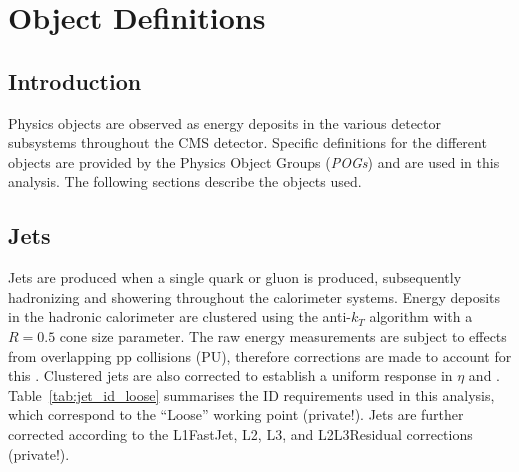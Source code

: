 \chapter{Object Definitions}

\ifpdf
    \graphicspath{{Chapter4/Figs/Raster/}{Chapter4/Figs/PDF/}{Chapter4/Figs/}}
\else
    \graphicspath{{Chapter4/Figs/Vector/}{Chapter4/Figs/}}
\fi


\section{Introduction}  %
\label{sec:objects_introduction}

Physics objects are observed as energy deposits in the various detector 
subsystems throughout the CMS detector. Specific definitions for the different 
objects are provided by the Physics Object Groups (\emph{POGs}) and are used in this 
analysis. The following sections describe the objects used.


\section{Jets}  %
\label{sec:objects_jets}

Jets are produced when a single quark or gluon is produced, subsequently 
hadronizing and showering throughout the calorimeter systems. Energy deposits in
the hadronic calorimeter are clustered using the anti-$k_T$ algorithm \cite{antikt} with
a $R=0.5$ cone size parameter. The raw energy measurements are subject to 
effects from overlapping pp collisions (PU), therefore corrections are made to
account for this \cite{Cacciari2008119, 1126-6708-2008-04-005}. Clustered jets 
are also corrected to establish a uniform response in $\eta$ and \Pt
\cite{Chatrchyan:2011ds}.
Table~\ref{tab:jet_id_loose} summarises the ID requirements used in this 
analysis, which correspond to the ``Loose'' working point \cite{ref:jet-id} 
(private!). Jets are further 
corrected according to the L1FastJet, L2, L3, and L2L3Residual corrections
\cite{ref:jet-jes} (private!).

